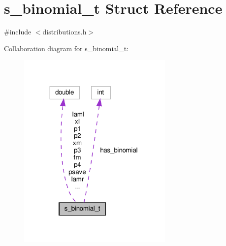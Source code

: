 \hypertarget{structs__binomial__t}{}\section{s\+\_\+binomial\+\_\+t Struct Reference}
\label{structs__binomial__t}


{\ttfamily \#include $<$distributions.\+h$>$}



Collaboration diagram for s\+\_\+binomial\+\_\+t\+:
\nopagebreak
\begin{figure}[H]
\begin{center}
\leavevmode
\includegraphics[width=215pt]{structs__binomial__t__coll__graph}
\end{center}
\end{figure}
